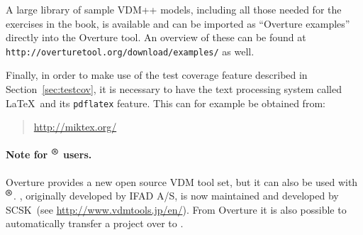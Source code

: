 \begin{description}

\end{description}

A large library of sample VDM++ models, including all those needed for the exercises in the book, is available and can be imported as ``Overture examples'' directly into the Overture tool.  An overview of these can be found at \texttt{http://overturetool.org/download/examples/} as well.

Finally, in order to make use of the test coverage feature described in Section~\ref{sec:testcov}, it is
necessary to have the text processing system called \LaTeX\ and its \texttt{pdflatex} feature. This can for example be obtained from:
%
\begin{quote}
\url{http://miktex.org/}
\end{quote}

\paragraph{Note for \vdmtools$^{\mbox{\small\textbf{{\textregistered}}}}$ users.}
Overture provides a new open source VDM tool set, but it can also be used with \vdmtools$^{\mbox{\small\textbf{{\textregistered}}}}$. \vdmtools, originally developed by IFAD A/S, is now maintained and developed by SCSK~(see \url{http://www.vdmtools.jp/en/}). From Overture it is also possible to automatically transfer a project over to \vdmtools.


